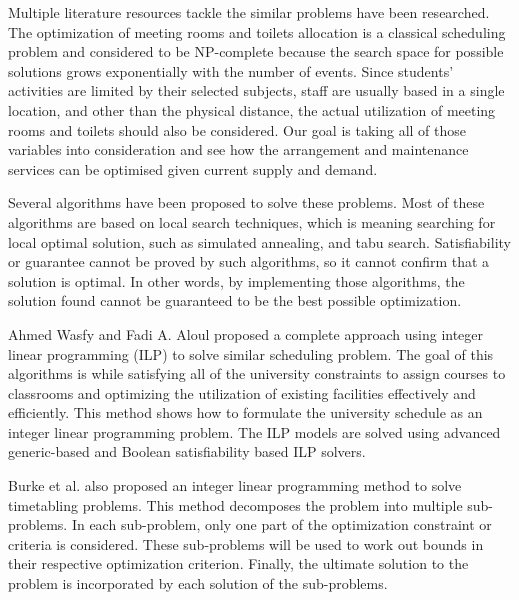 Multiple literature resources tackle the similar problems have been researched. The optimization of meeting rooms and toilets allocation is a classical scheduling problem and considered to be NP-complete \cite{np_problem} because the search space for possible solutions grows exponentially with the number of events. Since students’ activities are limited by their selected subjects, staff are usually based in a single location, and other than the physical distance, the actual utilization of meeting rooms and toilets should also be considered. Our goal is taking all of those variables into consideration and see how the arrangement and maintenance services can be optimised given current supply and demand.

Several algorithms have been proposed to solve these problems. Most of these algorithms are based on local search techniques, which is meaning searching for local optimal solution, such as simulated annealing, and tabu search. Satisfiability or guarantee cannot be proved by such algorithms, so it cannot confirm that a solution is optimal. In other words, by implementing those algorithms, the solution found cannot be guaranteed to be the best possible optimization.

Ahmed Wasfy and Fadi A. Aloul \cite{ilp} proposed a complete approach using integer linear programming (ILP) to solve similar scheduling problem. The goal of this algorithms is while satisfying all of the university constraints to assign courses to classrooms and optimizing the utilization of existing facilities effectively and efficiently. This method shows how to formulate the university schedule as an integer linear programming problem. The ILP models are solved using advanced generic-based and Boolean satisfiability based ILP solvers. 

Burke et al.\cite{burke2010decomposition} also proposed an integer linear programming method to solve timetabling problems. This method decomposes the problem into multiple sub-problems. In each sub-problem, only one part of the optimization constraint or criteria is considered. These sub-problems will be used to work out bounds in their respective optimization criterion. Finally, the ultimate solution to the problem is incorporated by each solution of the sub-problems.

